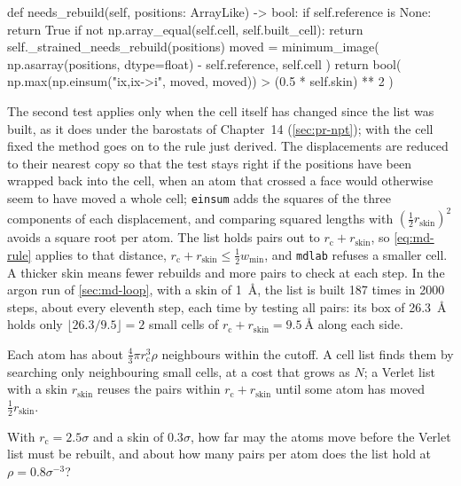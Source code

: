 \begin{code}
    def needs_rebuild(self, positions: ArrayLike) -> bool:
        if self.reference is None:
            return True
        if not np.array_equal(self.cell, self.built_cell):
            return self._strained_needs_rebuild(positions)
        moved = minimum_image(
            np.asarray(positions, dtype=float) - self.reference, self.cell
        )
        return bool(
            np.max(np.einsum("ix,ix->i", moved, moved))
            > (0.5 * self.skin) ** 2
        )
\end{code}

\noindent The second test applies only when the cell itself has changed
since the list was built, as it does under the barostats of
Chapter~14 (\cref{sec:pr-npt}); with the cell fixed the method goes on to
the rule just derived. The displacements are reduced to their nearest
copy so that the
test stays right if the positions have been wrapped back into the cell,
when an atom that crossed a face would otherwise seem to have moved a
whole cell; \texttt{einsum} adds the squares of the three components of
each displacement, and comparing squared lengths with
$(\frac12r_{\mathrm{skin}})^2$ avoids a square root per atom. The list
holds pairs out to $r_{\mathrm c} + r_{\mathrm{skin}}$, so
\cref{eq:md-rule} applies to that distance, $r_{\mathrm c} +
r_{\mathrm{skin}} \le \frac12w_{\min}$, and \texttt{mdlab} refuses a
smaller cell. A thicker skin means fewer rebuilds and more pairs to check
at each step. In the argon run of \cref{sec:md-loop}, with a skin of
\SI{1}{\angstrom}, the list is built 187 times in 2000 steps, about every
eleventh step, each time by testing all pairs: its box of
\SI{26.3}{\angstrom} holds only $\lfloor26.3/9.5\rfloor = 2$ small cells
of $r_{\mathrm c} + r_{\mathrm{skin}} = \SI{9.5}{\angstrom}$ along each
side.

\begin{keyidea}
Each atom has about $\frac43\pi r_{\mathrm c}^3\rho$ neighbours within the
cutoff. A cell list finds them by searching only neighbouring small cells,
at a cost that grows as $N$; a Verlet list with a skin
$r_{\mathrm{skin}}$ reuses the pairs within $r_{\mathrm c} +
r_{\mathrm{skin}}$ until some atom has moved $\frac12r_{\mathrm{skin}}$.
\end{keyidea}


\begin{selfcheck}
With $r_{\mathrm c} = 2.5\sigma$ and a skin of $0.3\sigma$, how far may
the atoms move before the Verlet list must be rebuilt, and about how many
pairs per atom does the list hold at $\rho = 0.8\sigma^{-3}$?
\end{selfcheck}
